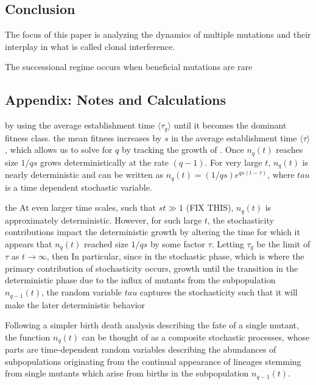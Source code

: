 \documentclass[12pt]{article}
\begin{document}
\subsection*{Conclusion}
The focus of this paper is analyzing the dynamics of multiple mutations and their interplay in what is called clonal interference.  

The successional regime occurs when beneficial mutations are rare




\subsection*{Appendix: Notes and Calculations}
by using the average establishment time $\langle \tau_q \rangle$ until it becomes the dominant fitness class.   the mean fitness increases by $s$ in the average establishment time $\langle \tau \rangle$, which allows us to solve for $q$ by tracking the growth of .  Once $n_q(t)$ reaches size $1/qs$ grows deterministically at the rate $(q-1)$.  For very large $t$, $n_q(t)$ is nearly deterministic and can be written as $n_q(t)= (1/qs)e^{qs(t-\tau)}$, where $tau$ is a time dependent stochastic variable.   

the At even larger time scales, such that $st\gg 1$ (FIX THIS), $n_q(t)$ is approximately deterministic.  However, for such large $t$, the stochasticity contributions impact the deterministic growth by altering the time for which it appears that $n_q(t)$ reached size $1/qs$ by some factor $\tau$.  Letting $\tau_q$ be the limit of $\tau$ as $t \rightarrow \infty$, then  In particular, since in the stochastic phase, which is where the primary contribution of stochasticity occurs, growth until the transition in the deterministic phase due to the influx of mutants from the subpopulation $n_{q-1}(t)$, the random variable $tau$ captures the stochasticity such that it will make the later deterministic behavior

Following a simpler birth death analysis describing the fate of a single mutant, the function $n_q(t)$ can be thought of as a composite stochastic processes, whose parts are time-dependent random variables describing the abundances of subpopulations originating from the continual appearance of lineages stemming from single mutants which arise from births in the subpopulation $n_{q-1}(t)$.  
\end{document}

